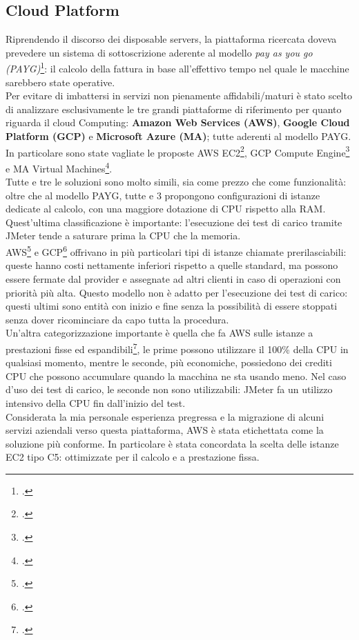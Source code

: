 \subsection{Cloud Platform}
Riprendendo il discorso dei disposable servers, la piattaforma ricercata doveva prevedere un sistema di sottoscrizione aderente al modello \textit{pay as you go (PAYG)}\footcite{article:payg}: il calcolo della fattura in base all'effettivo tempo nel quale le macchine sarebbero state operative. \\
Per evitare di imbattersi in servizi non pienamente affidabili/maturi è stato scelto di analizzare esclusivamente le tre grandi piattaforme di riferimento per quanto riguarda il \gls{cloud} Computing: \textbf{Amazon Web Services (AWS)}, \textbf{Google Cloud Platform (GCP)} e \textbf{Microsoft Azure (MA)}; tutte aderenti al modello PAYG. In particolare sono state vagliate le proposte AWS EC2\footcite{site:ec2}, GCP Compute Engine\footcite{site:gcpce} e MA Virtual Machines\footcite{site:mavm}. \\
Tutte e tre le soluzioni sono molto simili, sia come prezzo che come funzionalità: oltre che al modello PAYG, tutte e 3 propongono configurazioni di istanze dedicate al calcolo, con una maggiore dotazione di CPU rispetto alla RAM. Quest'ultima classificazione è importante: l'esecuzione dei test di carico tramite JMeter tende a saturare prima la CPU che la memoria.\\
AWS\footcite{article:awspre} e GCP\footcite{article:gcppre} offrivano in più particolari tipi di istanze chiamate prerilasciabili: queste hanno costi nettamente inferiori rispetto a quelle standard, ma possono essere fermate dal provider e assegnate ad altri clienti in caso di operazioni con priorità più alta. Questo modello non è adatto per l'esecuzione dei test di carico: questi ultimi sono entità con inizio e fine senza la possibilità di essere stoppati senza dover ricominciare da capo tutta la procedura. \\
Un'altra categorizzazione importante è quella che fa AWS sulle istanze a prestazioni fisse ed espandibili\footcite{article:awsesp}, le prime possono utilizzare il 100\% della CPU in qualsiasi momento, mentre le seconde, più economiche, possiedono dei crediti CPU che possono accumulare quando la macchina ne sta usando meno. Nel caso d'uso dei test di carico, le seconde non sono utilizzabili: JMeter fa un utilizzo intensivo della CPU fin dall'inizio del test.\\ 
Considerata la mia personale esperienza pregressa e la migrazione di alcuni servizi aziendali verso questa piattaforma, AWS è stata etichettata come la soluzione più conforme. In particolare è stata concordata la scelta delle istanze EC2 tipo C5: ottimizzate per il calcolo e a prestazione fissa.
